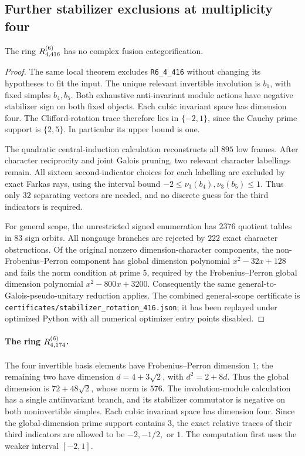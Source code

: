 \subsection{Further stabilizer exclusions at multiplicity four}
\label{subsec:stabilizer-rotation-416}
\begin{corollary}\label{cor:stabilizer-416}
The ring $R^{(6)}_{4,416}$ has no complex fusion categorification.
\end{corollary}
\begin{proof}
The same local theorem excludes \texttt{R6\_4\_416} without changing its
hypotheses to fit the input.  The unique relevant invertible involution is
$b_1$, with fixed simples $b_4,b_5$.  Both exhaustive anti-invariant module
actions have negative stabilizer sign on both fixed objects.  Each cubic
invariant space has dimension four.  The Clifford-rotation trace therefore
lies in $\{-2,1\}$, since the Cauchy prime support is $\{2,5\}$.
In particular its upper bound is one.

The quadratic central-induction calculation reconstructs all $895$ low
frames.  After character reciprocity and joint Galois pruning, two relevant
character labellings remain.  All sixteen second-indicator choices for each
labelling are excluded by exact Farkas rays, using the interval bound
$-2\leq\nu_3(b_4),\nu_3(b_5)\leq1$.  Thus only $32$ separating vectors are
needed, and no discrete guess for the third indicators is required.

For general scope, the unrestricted signed enumeration has $2376$ quotient
tables in $83$ sign orbits.  All nongauge branches are rejected by $222$
exact character obstructions.  Of the original nonzero dimension-character
components, the non-Frobenius--Perron component has global dimension polynomial
$x^2-32x+128$ and fails the norm condition at prime $5$, required by the
Frobenius--Perron global dimension polynomial $x^2-800x+3200$.
Consequently the same general-to-Galois-pseudo-unitary reduction applies.
The combined general-scope certificate is
\texttt{certificates/stabilizer\_rotation\_416.json}; it has been replayed
under optimized Python with all numerical optimizer entry points disabled.

\end{proof}

\paragraph{The ring $R^{(6)}_{4,174}$.}
The four invertible basis elements have Frobenius--Perron dimension $1$;
the remaining two have dimension $d=4+3\sqrt2$, with $d^2=2+8d$.
Thus the global dimension is $72+48\sqrt2$, whose norm is $576$.
The involution-module calculation has a single antiinvariant branch, and
its stabilizer commutator is negative on both noninvertible simples.
Each cubic invariant space has dimension four. Since the global-dimension
prime support contains $3$, the exact relative traces of their third
indicators are allowed to be $-2,-1/2,$ or $1$. The computation first uses
the weaker interval $[-2,1]$.

